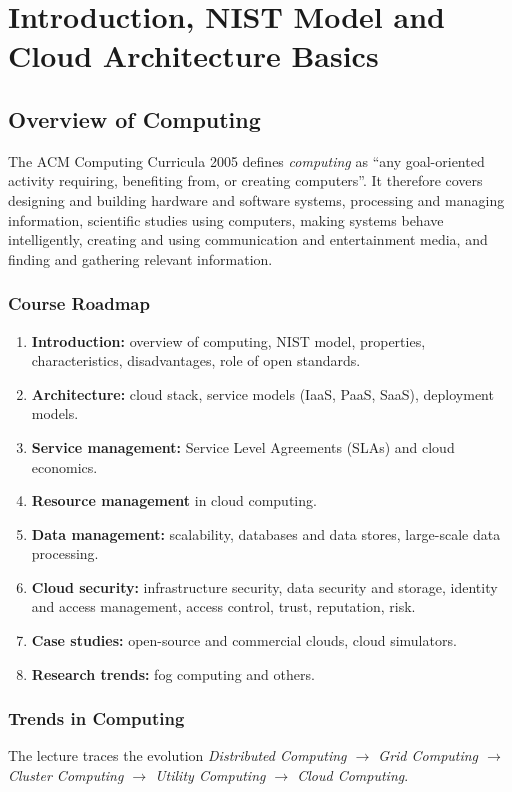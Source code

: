 \documentclass[11pt,a4paper,openany]{report}
\begin{document}
\chapter{Introduction, NIST Model and Cloud Architecture Basics}

\section{Overview of Computing}
The ACM Computing Curricula 2005 defines \emph{computing} as ``any goal-oriented activity
requiring, benefiting from, or creating computers''. It therefore covers designing and
building hardware and software systems, processing and managing information, scientific
studies using computers, making systems behave intelligently, creating and using
communication and entertainment media, and finding and gathering relevant information.

\subsection{Course Roadmap}
\begin{enumerate}[leftmargin=*]
  \item \textbf{Introduction:} overview of computing, NIST model, properties, characteristics,
        disadvantages, role of open standards.
  \item \textbf{Architecture:} cloud stack, service models (IaaS, PaaS, SaaS), deployment models.
  \item \textbf{Service management:} Service Level Agreements (SLAs) and cloud economics.
  \item \textbf{Resource management} in cloud computing.
  \item \textbf{Data management:} scalability, databases and data stores, large-scale data
        processing.
  \item \textbf{Cloud security:} infrastructure security, data security and storage,
        identity and access management, access control, trust, reputation, risk.
  \item \textbf{Case studies:} open-source and commercial clouds, cloud simulators.
  \item \textbf{Research trends:} fog computing and others.
\end{enumerate}

\subsection{Trends in Computing}
The lecture traces the evolution \emph{Distributed Computing $\rightarrow$ Grid Computing
$\rightarrow$ Cluster Computing $\rightarrow$ Utility Computing $\rightarrow$ Cloud Computing}.
\end{document}
